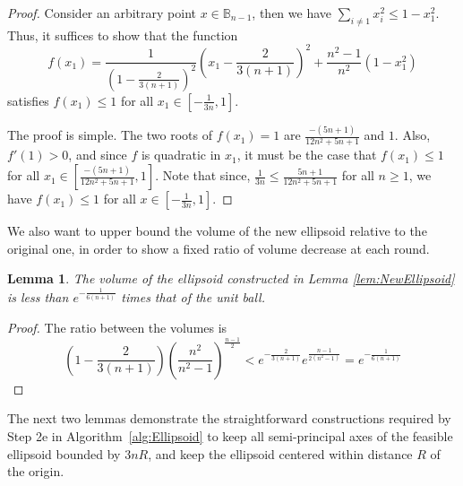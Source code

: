 \documentclass[11pt,letter]{article}
\newcounter{nTheorems}
\numberwithin{nTheorems}{section}
\newtheorem{lemma}[nTheorems]{Lemma}
\begin{document}
\begin{proof}
Consider an arbitrary point $x \in \mathbb{B}_{n-1}$, then we have $\sum_{i \neq 1} x_i^2 \le 1 - x_1^2$.
Thus, it suffices to show that the function
$$ f(x_1) = \frac{1}{(1-\frac{2}{3(n+1)})^2} \left(x_1 - \frac{2}{3(n+1)}\right)^2 + \frac{n^2-1}{n^2}(1 - x_1^2) $$
satisfies $f(x_1) \le 1$ for all $x_1 \in [-\frac{1}{3n}, 1]$.

The proof is simple.
The two roots of $f(x_1) = 1$ are $\frac{-(5n+1)}{12n^2+5n+1}$ and $1$.
Also, $f'(1) > 0$, and since $f$ is quadratic in $x_1$, it must be the case that $f(x_1) \le 1$ for all $x_1 \in \left[\frac{-(5n+1)}{12n^2+5n+1}, 1\right]$.
Note that since, $\frac{1}{3n} \le \frac{5n+1}{12n^2+5n+1}$ for all $n \ge 1$, we have $f(x_1) \le 1$ for all $x \in [-\frac{1}{3n}, 1]$.
\end{proof}

We also want to upper bound the volume of the new ellipsoid relative to the original one, in order to show a fixed ratio of volume decrease at each round.
\begin{lemma}
\label{lem:Volume}
The volume of the ellipsoid constructed in Lemma \ref{lem:NewEllipsoid} is less than $e^{-\frac{1}{6(n+1)}}$ times that of the unit ball.
\end{lemma}

\begin{proof}
The ratio between the volumes is
$$ \left(1-\frac{2}{3(n+1)}\right)\left(\frac{n^2}{n^2-1}\right)^{\frac{n-1}{2}} < e^{-\frac{2}{3(n+1)}}e^{\frac{n-1}{2(n^2-1)}} = e^{-\frac{1}{6(n+1)}} $$
\end{proof}

The next two lemmas demonstrate the straightforward constructions required by Step 2e in Algorithm~\ref{alg:Ellipsoid} to keep all semi-principal axes of the feasible ellipsoid bounded by $3nR$, and keep the ellipsoid centered within distance $R$ of the origin.
\end{document}

